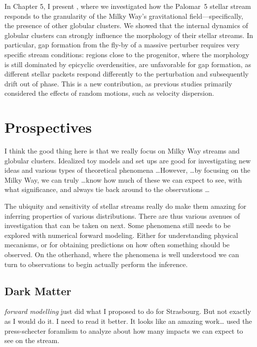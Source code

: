     In Chapter 5, I present \citet{2025A&A...699A.289F}, where we investigated how the Palomar~5 stellar stream responds to the granularity of the Milky Way's gravitational field—specifically, the presence of other globular clusters. We showed that the internal dynamics of globular clusters can strongly influence the morphology of their stellar streams. In particular, gap formation from the fly-by of a massive perturber requires very specific stream conditions: regions close to the progenitor, where the morphology is still dominated by epicyclic overdensities, are unfavorable for gap formation, as different stellar packets respond differently to the perturbation and subsequently drift out of phase. This is a new contribution, as previous studies primarily considered the effects of random motions, such as velocity dispersion.

\section{Prospectives}

    I think the good thing here is that we really focus on Milky Way streams and globular clusters. Idealized toy models and set ups are good for investigating new ideas and various types of theoretical phenomena \dots However, \dots by focusing on the Milky Way, we can truly \dots know how much of these we can expect to see, with what significance, and always tie back around to the observations \dots

    The ubiquity and sensitivity of stellar streams really do make them amazing for inferring properties of various distributions. There are thus various avenues of investigation that can be taken on next. Some phenomena still needs to be explored with numerical forward modeling. Either for understanding physical mecanisms, or for obtaining predictions on how often something should be observed. On the otherhand, where the phenomena is well understood we can turn to observations to begin actually perform the inference. 


    \subsection{Dark Matter}

        \textit{forward modelling}
            \citet{2025arXiv250207781L} just did what I proposed to do for Strasbourg. But not exactly as I would do it. I need to read it better. It looks like an amazing work\dots \citet{2024arXiv241213144A} used the press-schecter foramlism to analyze about how many impacts we can expect to see on the stream. 

